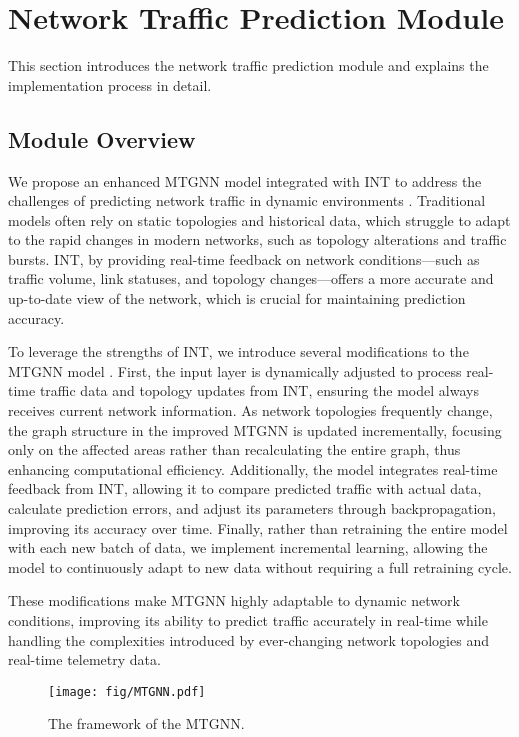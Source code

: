\documentclass[journal]{IEEEtran}
\begin{document}
\vspace{-1em}
\section{Network Traffic Prediction Module}
\label{section4}
This section introduces the network traffic prediction module and explains the implementation process in detail.


\subsection{Module Overview}

We propose an enhanced MTGNN model integrated with INT to address the challenges of predicting network traffic in dynamic environments \cite{17}. Traditional models often rely on static topologies and historical data, which struggle to adapt to the rapid changes in modern networks, such as topology alterations and traffic bursts. INT, by providing real-time feedback on network conditions—such as traffic volume, link statuses, and topology changes—offers a more accurate and up-to-date view of the network, which is crucial for maintaining prediction accuracy.

To leverage the strengths of INT, we introduce several modifications to the MTGNN model \cite{38}. First, the input layer is dynamically adjusted to process real-time traffic data and topology updates from INT, ensuring the model always receives current network information. As network topologies frequently change, the graph structure in the improved MTGNN is updated incrementally, focusing only on the affected areas rather than recalculating the entire graph, thus enhancing computational efficiency. Additionally, the model integrates real-time feedback from INT, allowing it to compare predicted traffic with actual data, calculate prediction errors, and adjust its parameters through backpropagation, improving its accuracy over time. Finally, rather than retraining the entire model with each new batch of data, we implement incremental learning, allowing the model to continuously adapt to new data without requiring a full retraining cycle.

These modifications make MTGNN highly adaptable to dynamic network conditions, improving its ability to predict traffic accurately in real-time while handling the complexities introduced by ever-changing network topologies and real-time telemetry data.

\begin{figure*}
\centering
\setlength{\abovecaptionskip}{0.cm}

\texttt{[image: fig/MTGNN.pdf]}
\caption{The framework of the MTGNN. }
\label{fig3}
\vspace{-0.1cm}
\end{figure*}
\end{document}
